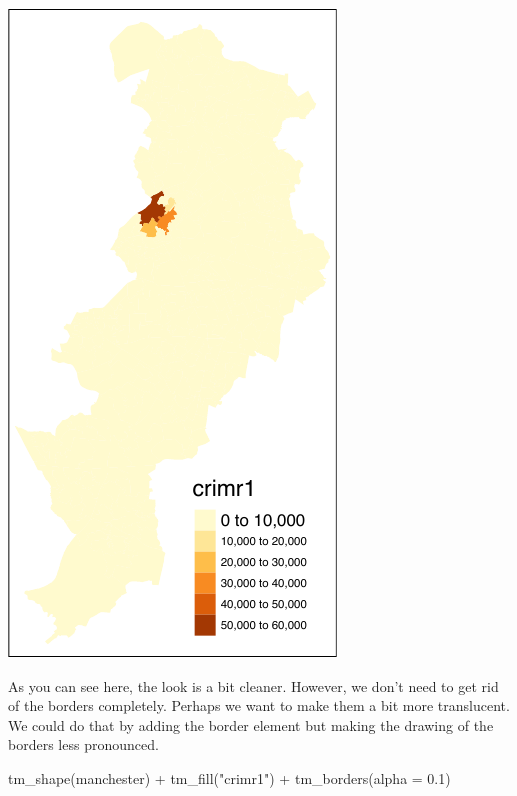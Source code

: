 \documentclass[
  krantz2]{krantz}
\makeatletter
\newenvironment{Shaded}{\begin{snugshade}}{\end{snugshade}}
\newcommand{\AttributeTok}[1]{\textcolor[rgb]{0.61,0.61,0.61}{#1}}
\newcommand{\FloatTok}[1]{\textcolor[rgb]{0.06,0.06,0.06}{#1}}
\newcommand{\FunctionTok}[1]{\textcolor[rgb]{0,0,0}{#1}}
\newcommand{\NormalTok}[1]{#1}
\newcommand{\SpecialCharTok}[1]{\textcolor[rgb]{0,0,0}{#1}}
\newcommand{\StringTok}[1]{\textcolor[rgb]{0.5,0.5,0.5}{#1}}
\newenvironment{kframe}{%
\medskip{}
\setlength{\fboxsep}{.8em}
 \def\at@end@of@kframe{}%
 \ifinner\ifhmode%
  \def\at@end@of@kframe{\end{minipage}}%
  \begin{minipage}{\columnwidth}%
 \fi\fi%
 \def\FrameCommand##1{\hskip\@totalleftmargin \hskip-\fboxsep
 \colorbox{shadecolor}{##1}\hskip-\fboxsep
     \hskip-\linewidth \hskip-\@totalleftmargin \hskip\columnwidth}%
 \MakeFramed {\advance\hsize-\width
   \@totalleftmargin\z@ \linewidth\hsize
   \@setminipage}}%
 {\par\unskip\endMakeFramed%
 \at@end@of@kframe}
\renewenvironment{Shaded}{\begin{kframe}}{\end{kframe}}
\makeatother
\begin{document}
\includegraphics{crime_mapping_files/figure-latex/unnamed-chunk-85-1.pdf}

As you can see here, the look is a bit cleaner. However, we don't need to get rid of the borders completely. Perhaps we want to make them a bit more translucent. We could do that by adding the border element but making the drawing of the borders less pronounced.

\begin{Shaded}
\begin{Highlighting}[]
\FunctionTok{tm\_shape}\NormalTok{(manchester) }\SpecialCharTok{+} 
  \FunctionTok{tm\_fill}\NormalTok{(}\StringTok{"crimr1"}\NormalTok{) }\SpecialCharTok{+}
  \FunctionTok{tm\_borders}\NormalTok{(}\AttributeTok{alpha =} \FloatTok{0.1}\NormalTok{)}
\end{Highlighting}
\end{Shaded}
\end{document}

